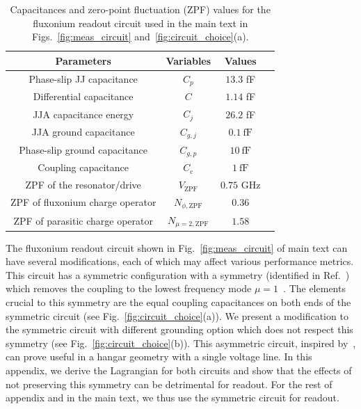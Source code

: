\documentclass[%
reprint,
superscriptaddress,
 amsmath,amssymb,
 aps,
 prx,
longbibliography,
floatfix,
]{revtex4-2}
\begin{document}
\begin{table}[htb]
    \begin{center}
    \begin{tabular}{|c |c| c |c| }
     \hline
     \textbf{Parameters} & \textbf{Variables} & \textbf{Values}\\ 
    \hline
    Phase-slip JJ capacitance &$C_p$ &$13.3$ fF\\ 
    \hline
    Differential capacitance &$C$ &$1.14$ fF\\ 
    \hline
    JJA capacitance energy&$C_j$&$26.2$ fF\\ 
    \hline
    JJA ground capacitance&$C_{g,j}$&$0.1 \ \mathrm{fF}$\\ 
    \hline
    Phase-slip ground capacitance&$C_{g,p}$&$10 \ \mathrm{fF}$\\ 
    \hline
    Coupling capacitance&$C_\textrm{c}$ &$1 \ \mathrm{fF}$\\ 
     \hline
      ZPF of the resonator/drive&$V_{\mathrm{ZPF}}$&$0.75$ GHz\\
     \hline
      ZPF of fluxonium charge operator&$N_{\phi,\mathrm{ZPF}}$&$0.36$\\
     \hline
      ZPF of parasitic charge operator&$N_{\mu=2,\mathrm{ZPF}}$&$1.58$\\
     \hline
    \end{tabular}
    \end{center}
    
    \caption{Capacitances and zero-point fluctuation (ZPF) values for the fluxonium readout circuit used in the main text in Figs.~\ref{fig:meas_circuit} and~\ref{fig:circuit_choice}(a).}
    \label{tab:params}
    \end{table}
The fluxonium readout circuit shown in Fig.~\ref{fig:meas_circuit} of main text can have several modifications, each of which may affect various performance metrics. This circuit has a symmetric configuration with a symmetry (identified in Ref.~\cite{ferguson2013symmetries}) which removes the coupling to the lowest frequency mode $\mu=1$~\cite{viola2015collective}. The elements crucial to this symmetry are the equal coupling capacitances on both ends of the symmetric circuit (see Fig.~\ref{fig:circuit_choice}(a)). We present a modification to the symmetric circuit with different grounding option which does not respect this symmetry (see Fig.~\ref{fig:circuit_choice}(b)). This asymmetric circuit, inspired by~\cite{zhang_universal_2021}, can prove useful in a hangar geometry with a single voltage line. In this appendix, we derive the Lagrangian for both circuits and show that the effects of not preserving this symmetry can be detrimental for readout. For the rest of appendix and in the main text, we thus use the symmetric circuit for readout.
\end{document}
